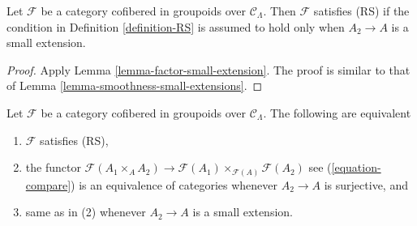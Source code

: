 \begin{lemma}
\label{lemma-RS-small-extension}
Let $\mathcal{F}$ be a category cofibered in groupoids over $\mathcal
C_\Lambda$. Then $\mathcal{F}$ satisfies (RS) if the condition in
Definition \ref{definition-RS} is assumed to hold only when $A_2 \to A$
is a small extension.
\end{lemma}

\begin{proof}
Apply Lemma \ref{lemma-factor-small-extension}.  The proof is similar to that
of Lemma \ref{lemma-smoothness-small-extensions}.
\end{proof}

\begin{lemma}
\label{lemma-RS-2-categorical}
Let $\mathcal{F}$ be a category cofibered in groupoids over
$\mathcal{C}_\Lambda$. The following are equivalent
\begin{enumerate}
\item $\mathcal{F}$ satisfies (RS),
\item the functor
$\mathcal{F}(A_1 \times_A A_2) \to
\mathcal{F}(A_1) \times_{\mathcal{F}(A)} \mathcal{F}(A_2)$
see (\ref{equation-compare}) is an equivalence of
categories whenever $A_2 \to A$ is surjective, and
\item same as in (2) whenever $A_2 \to A$ is a small extension.
\end{enumerate}
\end{lemma}

